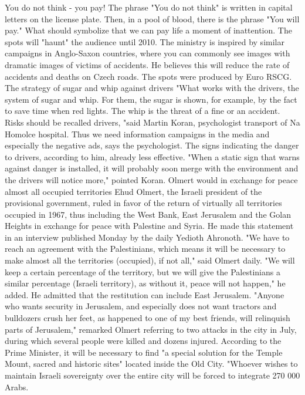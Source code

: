 You do not think - you pay!
The phrase "You do not think" is written in capital letters on the license plate.
Then, in a pool of blood, there is the phrase "You will pay."
What should symbolize that we can pay life a moment of inattention.
The spots will "haunt" the audience until 2010.
The ministry is inspired by similar campaigns in Anglo-Saxon countries, where you can commonly see images with dramatic images of victims of accidents.
He believes this will reduce the rate of accidents and deaths on Czech roads.
The spots were produced by Euro RSCG.
The strategy of sugar and whip against drivers
"What works with the drivers, the system of sugar and whip.
For them, the sugar is shown, for example, by the fact to save time when red lights.
The whip is the threat of a fine or an accident.
Risks should be recalled drivers, "said Martin Koran, psychologist transport of Na Homolce hospital.
Thus we need information campaigns in the media and especially the negative ads, says the psychologist.
The signs indicating the danger to drivers, according to him, already less effective.
"When a static sign that warns against danger is installed, it will probably soon merge with the environment and the drivers will notice more," pointed Koran.
Olmert would in exchange for peace almost all occupied territories
Ehud Olmert, the Israeli president of the provisional government, ruled in favor of the return of virtually all territories occupied in 1967, thus including the West Bank, East Jerusalem and the Golan Heights in exchange for peace with Palestine and Syria.
He made this statement in an interview published Monday by the daily Yedioth Ahronoth.
"We have to reach an agreement with the Palestinians, which means it will be necessary to make almost all the territories (occupied), if not all," said Olmert daily.
"We will keep a certain percentage of the territory, but we will give the Palestinians a similar percentage (Israeli territory), as without it, peace will not happen," he added.
He admitted that the restitution can include East Jerusalem.
"Anyone who wants security in Jerusalem, and especially does not want tractors and bulldozers crush her feet, as happened to one of my best friends, will relinquish parts of Jerusalem," remarked Olmert referring to two attacks in the city in July, during which several people were killed and dozens injured.
According to the Prime Minister, it will be necessary to find "a special solution for the Temple Mount, sacred and historic sites" located inside the Old City.
"Whoever wishes to maintain Israeli sovereignty over the entire city will be forced to integrate 270 000 Arabs.
